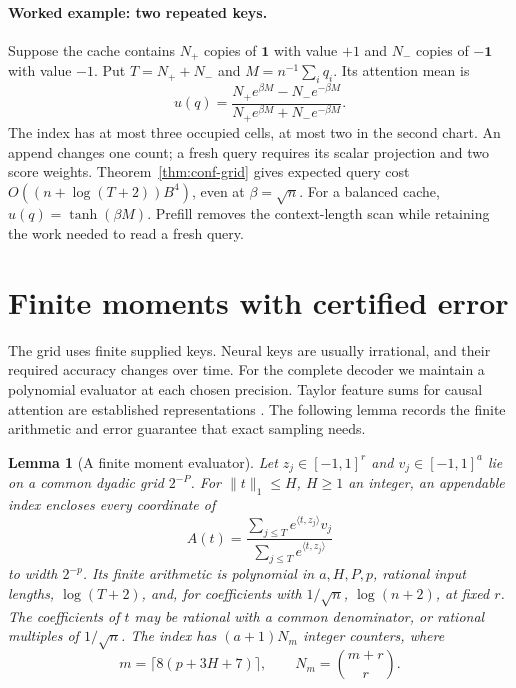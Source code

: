 \documentclass[11pt]{article}
\newtheorem{lemma}[theorem]{Lemma}
\theoremstyle{definition}\newtheorem{definition}[theorem]{Definition}
\theoremstyle{remark}\newtheorem{remark}[theorem]{Remark}
\numberwithin{equation}{section}
\begin{document}
\paragraph{Worked example: two repeated keys.}
Suppose the cache contains $N_+$ copies of $\mathbf1$ with value $+1$
and $N_-$ copies of $-\mathbf1$ with value $-1$. Put
$T=N_++N_-$ and $M=n^{-1}\sum_iq_i$. Its attention mean is
\[
 u(q)=\frac{N_+e^{\beta M}-N_-e^{-\beta M}}
            {N_+e^{\beta M}+N_-e^{-\beta M}}.
\]
The index has at most three occupied cells, at most two in the second
chart. An append changes one count;
a fresh query requires its scalar projection and two score weights.
Theorem~\ref{thm:conf-grid} gives expected query cost
\mbox{$O((n+\log(T+2))B^4)$}, even at $\beta=\sqrt n$.
For a balanced cache, $u(q)=\tanh(\beta M)$. Prefill removes the
context-length scan while retaining the work needed to read a fresh query.

\section{Finite moments with certified error}
\label{sec:conf-moments}

The grid uses finite supplied keys. Neural keys are usually irrational,
and their required accuracy changes over time. For the complete decoder
we maintain a polynomial evaluator at each chosen precision. Taylor
feature sums for causal attention are established representations
\cite{katharopoulos2020linear,heinsen2026taylor}. The following lemma
records the finite arithmetic and error guarantee that exact sampling
needs.

\begin{lemma}[A finite moment evaluator]
\label{lem:conf-moments}
Let $z_j\in[-1,1]^r$ and $v_j\in[-1,1]^a$ lie on a common dyadic
grid $2^{-P}$. For $\|t\|_1\le H$, $H\ge1$ an integer, an appendable
index encloses every coordinate of
\[
 A(t)=\frac{\sum_{j\le T}e^{\langle t,z_j\rangle}v_j}
              {\sum_{j\le T}e^{\langle t,z_j\rangle}}
\]
to width $2^{-p}$. Its finite arithmetic is polynomial in
$a,H,P,p$, rational input lengths, $\log(T+2)$, and, for coefficients
with $1/\sqrt n$, $\log(n+2)$, at fixed $r$.
The coefficients of $t$ may be rational with a common denominator,
or rational multiples of $1/\sqrt n$. The index has
$(a+1)N_m$ integer counters, where
\begin{equation}
 m=\lceil8(p+3H+7)\rceil,\qquad N_m=\binom{m+r}{r}.
 \label{eq:conf-features}
\end{equation}
\end{lemma}
\end{document}
